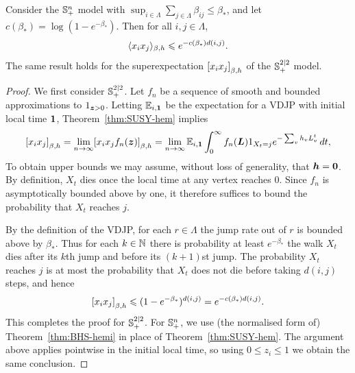 \documentclass[11pt,a4paper]{article}
\begin{document}
\begin{theorem}
  \label{thm:decay-hemi}
  Consider the ${\mathbb S}^{n}_{+}$  model with
  $\sup_{i\in\Lambda}\sum_{j\in\Lambda}\beta_{ij} \leq \beta_{*}$,
  and let $c(\beta_*) = \log (1-e^{-\beta_*})$.
  Then for all $i,j\in\Lambda$,
  \begin{equation}
    \label{eq:decay-hemi}
    \langle x_{i}x_{j} \rangle_{\beta,h}
    \leqslant e^{-c(\beta_*)d(i,j)}.
  \end{equation}
  The same result holds for the superexpectation
  $\cb{x_{i}x_{j}}_{\beta,h}$ of the ${\mathbb S}^{2|2}_{+}$ model.
\end{theorem}
\begin{proof}
  We first consider ${\mathbb S}^{2|2}_{+}$. Let $f_{n}$ be a sequence of
  smooth and bounded approximations to $1_{\boldsymbol{z}>0}$. Letting
  $\mathbb{E}_{i,\boldsymbol{1}}$ be the expectation for a VDJP with initial local time
  $\boldsymbol{1}$, Theorem~\ref{thm:SUSY-hem} implies
  \begin{equation*}
    \cb{x_{i}x_{j}}_{\beta,h}
    = \lim_{n\to\infty} \cb{x_{i}x_{j} f_{n}(\V{z})}_{\beta,h}
    = \lim_{n\to\infty }\E_{i,\V{1}}\int_{0}^{\infty}f_{n}(\V{L})1_{X_{t}=j}e^{-\sum_{v}h_{v}L^{t}_{v}}\, dt,
  \end{equation*}
  To obtain upper bounds we may assume, without loss of generality,
  that $\boldsymbol{h}=\boldsymbol{0}$.
  By definition, $X_t$ dies once the local time at any vertex reaches
  $0$.  Since $f_{n}$ is asymptotically bounded above by one,
  it therefore suffices to bound the probability that $X_{t}$
  reaches $j$.

  By the definition of the VDJP, for each $r\in\Lambda$ the jump rate
  out of $r$ is bounded above by $\beta_*$.
  Thus for each
  $k\in\mathbb{N}$ there is probability at least $e^{-\beta_*}$ 
  the
  walk $X_{t}$ dies after its $k$th jump and before its $(k+1)$st
  jump. The probability $X_{t}$ reaches $j$ is at most the probability
  that $X_{t}$ does not die before taking $d(i,j)$ steps, and hence
  \begin{equation*}
    \cb{x_{i}x_{j}}_{\beta,h}
    \leq (1-e^{-\beta_*})^{d(i,j)}
    = e^{-c(\beta_*)d(i,j)}.
  \end{equation*}
  This completes the proof for ${\mathbb S}^{2|2}_{+}$.  For ${\mathbb S}^{n}_{+}$,
  we use (the normalised form of) Theorem~\ref{thm:BHS-hemi} in
  place of Theorem~\ref{thm:SUSY-hem}. The argument above applies
  pointwise in the initial local time, so using $0\leq z_{i}\leq 1$ we
  obtain the same conclusion.
\end{proof}
\end{document}
